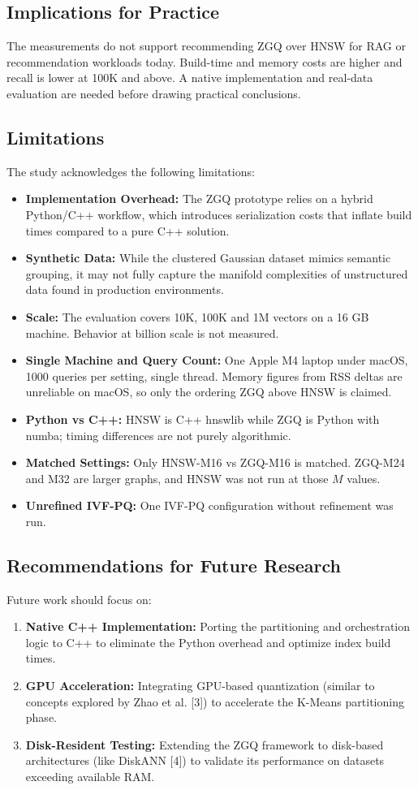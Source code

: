 \documentclass[conference]{IEEEtran}
\begin{document}
\subsection{Implications for Practice}
The measurements do not support recommending ZGQ over HNSW for RAG or recommendation workloads today. Build-time and memory costs are higher and recall is lower at 100K and above. A native implementation and real-data evaluation are needed before drawing practical conclusions.

\subsection{Limitations}
The study acknowledges the following limitations:
\begin{itemize}
    \item \textbf{Implementation Overhead:} The ZGQ prototype relies on a hybrid Python/C++ workflow, which introduces serialization costs that inflate build times compared to a pure C++ solution.
    \item \textbf{Synthetic Data:} While the clustered Gaussian dataset mimics semantic grouping, it may not fully capture the manifold complexities of unstructured data found in production environments.
    \item \textbf{Scale:} The evaluation covers 10K, 100K and 1M vectors on a 16 GB machine. Behavior at billion scale is not measured.
    \item \textbf{Single Machine and Query Count:} One Apple M4 laptop under macOS, 1000 queries per setting, single thread. Memory figures from RSS deltas are unreliable on macOS, so only the ordering ZGQ above HNSW is claimed.
    \item \textbf{Python vs C++:} HNSW is C++ hnswlib while ZGQ is Python with numba; timing differences are not purely algorithmic.
    \item \textbf{Matched Settings:} Only HNSW-M16 vs ZGQ-M16 is matched. ZGQ-M24 and M32 are larger graphs, and HNSW was not run at those $M$ values.
    \item \textbf{Unrefined IVF-PQ:} One IVF-PQ configuration without refinement was run.
\end{itemize}

\subsection{Recommendations for Future Research}
Future work should focus on:
\begin{enumerate}
    \item \textbf{Native C++ Implementation:} Porting the partitioning and orchestration logic to C++ to eliminate the Python overhead and optimize index build times.
    \item \textbf{GPU Acceleration:} Integrating GPU-based quantization (similar to concepts explored by Zhao et al. [3]) to accelerate the K-Means partitioning phase.
    \item \textbf{Disk-Resident Testing:} Extending the ZGQ framework to disk-based architectures (like DiskANN [4]) to validate its performance on datasets exceeding available RAM.
\end{enumerate}
\end{document}
